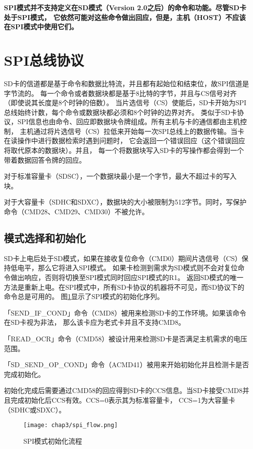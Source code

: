 \textbf{SPI模式并不支持定义在SD模式（Version 2.0之后）的命令和功能。尽管SD卡处于SPI模式，
    它依然可能对这些命令做出回应，但是，主机（HOST）不应该在SPI模式中使用它们。}



\section{SPI总线协议}
\label{sec:spibus}

SD卡的信道都是基于命令和数据比特流，并且都有起始位和结束位，故SPI信道是字节流的。
每一个命令或者数据块都是基于8比特的字节，并且与CS信号对齐（即使说其长度是8个时钟的倍数）。
当片选信号（CS）使能后，SD卡开始为SPI总线始终计数，每个命令或数据块都必须和8个时钟的边界对齐。
类似于SD卡协议，SPI信息也由命令、回应即数据块令牌组成。所有主机与卡的通信都由主机控制，
主机通过将片选信号（CS）拉低来开始每一次SPI总线上的数据传输。当卡在读操作中进行数据检索时遇到问题时，
它会返回一个错误回应（这个错误回应将取代原本的数据块）。并且，
每一个将数据块写入SD卡的写操作都会得到一个带着数据回答令牌的回应。

对于标准容量卡（SDSC），一个数据块最小是一个字节，最大不超过卡的写入块。

对于大容量卡（SDHC和SDXC），数据块的大小被限制为512字节。同时，写保护命令（CMD28、CMD29、CMD30）不被允许。

\subsection{模式选择和初始化}
\label{sec:modeinit}

SD卡上电后处于SD模式，如果在接收复位命令（CMD0）期间片选信号（CS）保持低电平，那么它将进入SPI模式。
如果卡检测到需求为SD模式则不会对复位命令做出响应，否则将切换至SPI模式同时回应SPI模式的R1。
返回SD模式的唯一方法是重新上电。在SPI模式中，所有SD卡协议的机器将不可见，而SD协议下的命令总是可用的。
图\ref{fig:spiflow}显示了SPI模式的初始化序列。

「SEND\_IF\_COND」命令（CMD8）被用来检测SD卡的工作环境。如果该命令在SD卡视为非法，
那么该卡应为老式卡并且不支持CMD8。

「READ\_OCR」命令（CMD58）被设计用来检测SD卡是否满足主机需求的电压范围。

「SD\_SEND\_OP\_COND」命令（ACMD41）被用来开始初始化并且检测卡是否完成初始化。

初始化完成后需要通过CMD58的回应得到SD卡的CCS信息。当SD卡接受CMD8并且完成初始化后CCS有效。CCS=0表示其为标准容量卡，
CCS=1为大容量卡（SDHC或SDXC）。
\begin{figure}[!htbp]
    \centering
    \texttt{[image: chap3/spi\_flow.png]}
    \\
    \caption{SPI模式初始化流程} \label{fig:spiflow}
\end{figure}

